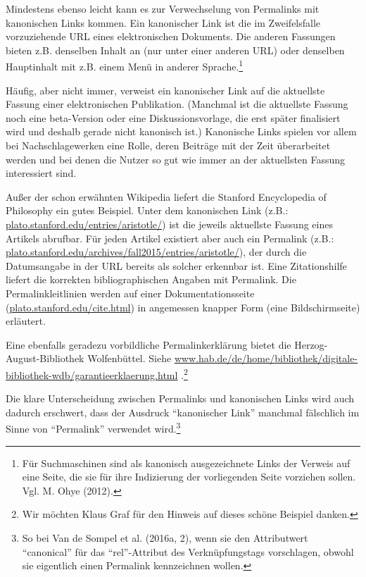 \documentclass[12pt, a4paper]{article}
\begin{document}
Mindestens ebenso leicht kann es zur Verwechselung von Permalinks mit
kanonischen Links kommen. Ein kanonischer Link ist die im
Zweifelsfalle vorzuziehende URL eines elektronischen Dokuments. Die
anderen Fassungen bieten z.B. denselben Inhalt an (nur unter einer
anderen URL) oder denselben Hauptinhalt mit z.B. einem Menü in anderer
Sprache.\footnote{Für Suchmaschinen sind als kanonisch ausgezeichnete
  Links der Verweis auf eine Seite, die sie für ihre Indizierung der
  vorliegenden Seite vorziehen sollen. Vgl. M. Ohye (2012).}

Häufig, aber nicht immer, verweist ein kanonischer Link auf die
aktuellste Fassung einer elektronischen Publikation. (Manchmal ist die
aktuellste Fassung noch eine beta-Version oder eine
Diskussionsvorlage, die erst später finalisiert wird und deshalb
gerade nicht kanonisch ist.) Kanonische Links spielen vor allem bei
Nachschlagewerken eine Rolle, deren Beiträge mit der Zeit überarbeitet
werden und bei denen die Nutzer so gut wie immer an der aktuellsten
Fassung interessiert sind.

Außer der schon erwähnten Wikipedia liefert die Stanford Encyclopedia
of Philosophy ein gutes Beispiel. Unter dem kanonischen Link (z.B.:
\href{http://plato.stanford.edu/entries/aristotle/}{plato.stanford.edu/\-entries/\-aristotle/})
ist die jeweils aktuellste Fassung eines Artikels abrufbar. Für jeden
Artikel existiert aber auch ein Permalink (z.B.:
\href{http://plato.stanford.edu/archives/fall2015/entries/aristotle/}{plato.stanford.edu/\-archives/\-fall2015/\-entries/\-aristotle/}),
der durch die Datumsangabe in der URL bereits als solcher erkennbar
ist. Eine Zitationshilfe liefert die korrekten bibliographischen
Angaben mit Permalink. Die Permalinkleitlinien werden auf einer
Dokumentationsseite
(\href{http://plato.stanford.edu/cite.html}{plato.stanford.edu/\-cite.html})
in angemessen knapper Form (eine Bildschirmseite) erläutert.

Eine ebenfalls geradezu vorbildliche Permalinkerklärung bietet die
Herzog-August-Bibliothek Wolfenbüttel. Siehe
\href{http://www.hab.de/de/home/bibliothek/digitale-bibliothek-wdb/garantieerklaerung.html}{www.hab.de/\-de/\-home/\-bibliothek/\-digitale-bibliothek-wdb/\-garantieerklaerung.html}
.\footnote{Wir möchten Klaus Graf für den Hinweis auf dieses
  schöne Beispiel danken.}

Die klare Unterscheidung zwischen Permalinks und kanonischen Links
wird auch dadurch erschwert, dass der Ausdruck "`kanonischer Link"'
manchmal fälschlich im Sinne von "`Permalink"' verwendet
wird.\footnote{So bei Van de Sompel et al. (2016a, 2), wenn sie den
  Attributwert "`canonical"' für das "`rel"'-Attribut des
  Verknüpfungstags vorschlagen, obwohl sie eigentlich einen Permalink
  kennzeichnen wollen.}
\end{document}
